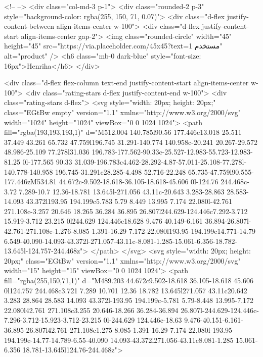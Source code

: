         <!--  -->
        <div class="col-md-3 p-1">
          <div class="rounded-2 p-3" style="background-color: rgba(255, 150, 71, 0.07)">
            <div class="d-flex justify-content-between align-items-center w-100">
              <div class="d-flex justify-content-start align-items-center gap-2">
                <img class="rounded-circle" width="45" height="45"
                  src="https://via.placeholder.com/45x45?text=مستخدم 1" alt="product" />
                <h6 class="mb-0 dark-blue" style="font-size: 16px">Henriha</h6>
              </div>

              <div class="d-flex flex-column text-end justify-content-start align-items-center w-100">
                <div class="rating-stars d-flex justify-content-end w-100">
                  <div class="rating-stars d-flex">
                    <svg style="width: 20px; height: 20px;" class="EGtBw empty" version="1.1"
                      xmlns="http://www.w3.org/2000/svg" width="1024" height="1024" viewBox="0 0 1024 1024">
                      <path fill="rgba(193,193,193,1)"
                        d="M512.004 140.785l90.56 177.446c13.018 25.511 37.449 43.261 65.732 47.759l196.745 31.291-140.774 140.958c-20.241 20.267-29.572 48.986-25.109 77.278l31.036 196.783-177.562-90.33c-25.527-12.983-55.723-12.983-81.25 0l-177.565 90.33 31.039-196.783c4.462-28.292-4.87-57.011-25.108-77.278l-140.778-140.958 196.745-31.291c28.285-4.498 52.716-22.248 65.735-47.759l90.555-177.446zM534.81 44.672c-9.502-18.618-36.105-18.618-45.606 0l-124.76 244.468c-3.72 7.289-10.7 12.36-18.781 13.645l-271.056 43.11c-20.643 3.283-28.863 28.583-14.093 43.372l193.95 194.199c5.783 5.79 8.449 13.995 7.174 22.080l-42.761 271.108c-3.257 20.646 18.265 36.284 36.895 26.807l244.629-124.446c7.292-3.712 15.919-3.712 23.215 0l244.629 124.446c18.628 9.476 40.149-6.161 36.894-26.807l-42.761-271.108c-1.276-8.085 1.391-16.29 7.172-22.080l193.95-194.199c14.771-14.79 6.549-40.090-14.093-43.372l-271.057-43.11c-8.081-1.285-15.061-6.356-18.782-13.645l-124.757-244.468z">
                      </path>
                    </svg>
                    <svg style="width: 20px; height: 20px;" class="EGtBw" version="1.1"
                      xmlns="http://www.w3.org/2000/svg" width="15" height="15" viewBox="0 0 1024 1024">
                      <path fill="rgba(255,150,71,1)"
                        d="M489.203 44.672c9.502-18.618 36.105-18.618 45.606 0l124.757 244.468c3.721 7.289 10.701 12.36 18.782 13.645l271.057 43.11c20.642 3.283 28.864 28.583 14.093 43.372l-193.95 194.199c-5.781 5.79-8.448 13.995-7.172 22.080l42.761 271.108c3.255 20.646-18.266 36.284-36.894 26.807l-244.629-124.446c-7.296-3.712-15.923-3.712-23.215 0l-244.629 124.446c-18.63 9.476-40.151-6.161-36.895-26.807l42.761-271.108c1.275-8.085-1.391-16.29-7.174-22.080l-193.95-194.199c-14.77-14.789-6.55-40.090 14.093-43.372l271.056-43.11c8.081-1.285 15.061-6.356 18.781-13.645l124.76-244.468z">

